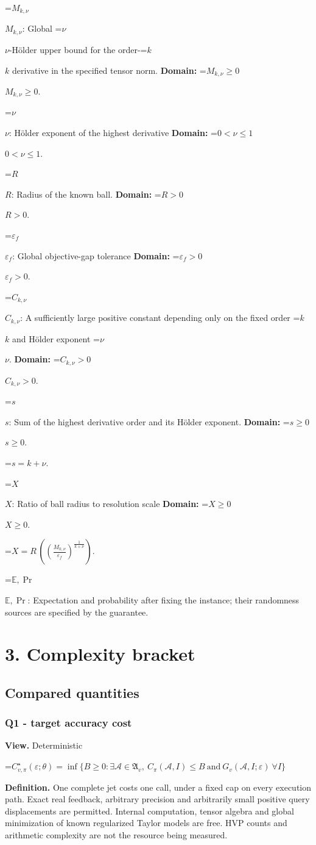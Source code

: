 \documentclass[10pt,a4paper]{article}
\newcommand{\AtlasMath}[1]{\par\begingroup\centering\setbox0=\hbox{$\displaystyle #1$}\ifdim\wd0>1.4\linewidth\typeout{ATLAS WIDE FORMULA: \the\wd0}\fi\ifdim\wd0>\linewidth\resizebox{\linewidth}{!}{\box0}\else\box0\fi\par\endgroup}
\newcommand{\AtlasInlineMath}[1]{\begingroup\setbox0=\hbox{$#1$}\ifdim\wd0>.4\linewidth\endgroup\AtlasMath{#1}\else\endgroup$#1$\fi}
\begin{document}
\AtlasInlineMath{M_{k,\nu}}: Global \AtlasInlineMath{\nu}-Hölder upper bound for the order-\AtlasInlineMath{k} derivative in the specified tensor norm. \textbf{Domain:} \AtlasInlineMath{M_{k,\nu}\ge0}.

\AtlasInlineMath{\nu}: Hölder exponent of the highest derivative \textbf{Domain:} \AtlasInlineMath{0<\nu\le1}.

\AtlasInlineMath{R}: Radius of the known ball. \textbf{Domain:} \AtlasInlineMath{R>0}.

\AtlasInlineMath{\varepsilon_f}: Global objective-gap tolerance \textbf{Domain:} \AtlasInlineMath{\varepsilon_f>0}.

\AtlasInlineMath{C_{k,\nu}}: A sufficiently large positive constant depending only on the fixed order \AtlasInlineMath{k} and Hölder exponent \AtlasInlineMath{\nu}. \textbf{Domain:} \AtlasInlineMath{C_{k,\nu}>0}.

\AtlasInlineMath{s}: Sum of the highest derivative order and its Hölder exponent. \textbf{Domain:} \AtlasInlineMath{s\ge0}.


\AtlasMath{s=k+\nu.}


\AtlasInlineMath{X}: Ratio of ball radius to resolution scale \textbf{Domain:} \AtlasInlineMath{X\ge0}.


\AtlasMath{X=R\,((\frac{M_{k,\nu}}{\varepsilon_f})^{\frac{1}{k+\nu}}).}


\AtlasInlineMath{\mathbb{E},\Pr}: Expectation and probability after fixing the instance; their randomness sources are specified by the guarantee.

\section{3. Complexity bracket}
\subsection{Compared quantities}
\subsubsection{Q1 - target accuracy cost}
\textbf{View.} Deterministic

\AtlasMath{C^\star_{v,\pi}(\varepsilon;\theta)=\inf\{B\ge0:\exists\mathcal A\in\mathfrak A_v,\ C_\pi(\mathcal A,I)\le B\ \text{and}\ G_v(\mathcal A,I;\varepsilon)\ \forall I\}}
\textbf{Definition.} One complete jet costs one call, under a fixed cap on every execution path. Exact real feedback, arbitrary precision and arbitrarily small positive query displacements are permitted. Internal computation, tensor algebra and global minimization of known regularized Taylor models are free. HVP counts and arithmetic complexity are not the resource being measured.
\end{document}
